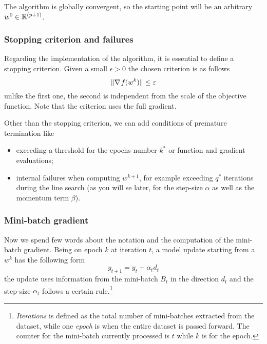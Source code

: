 The algorithm is globally convergent, so the starting point will be an arbitrary $w^0\in\mathbb{R}^{(p+1)}$.

\subsubsection*{Stopping criterion and failures}

Regarding the implementation of the algorithm, it is essential to define a stopping criterion. Given a small $\epsilon>0$ the chosen criterion is as follows
\begin{equation}\label{eq:stopping}
\lVert\nabla\operatorname*{\mathit{f}}(w^k)\rVert\leq\varepsilon
\end{equation}
unlike the first one, the second is independent from the scale of the objective function. Note that the criterion uses the full gradient.

Other than the stopping criterion, we can add conditions of premature termination like
\begin{itemize}
\item exceeding a threshold for the epochs number $k^\ast$ or function and gradient evaluations;
\item internal failures when computing $w^{k+1}$, for example exceeding $q^\ast$ iterations during the line search (as you will se later, for the step-size $\alpha$ as well as the momentum term $\beta$).
\end{itemize}


\subsubsection*{Mini-batch gradient}

Now we spend few words about the notation and the computation of the mini-batch gradient. Being on epoch $k$ at iteration $t$, a model update starting from a $w^k$ has the following form
\begin{equation}\label{eq:sgd-step}
y_{t+1}=y_t+\alpha_td_t
\end{equation}
the update uses information from the mini-batch $B_t$ in the direction $d_t$ and the step-size $\alpha_t$ follows a certain rule.\footnote{\emph{Iterations} is defined as the total number of mini-batches extracted from the dataset, while one \emph{epoch} is when the entire dataset is passed forward. The counter for the mini-batch currently processed is $t$ while $k$ is for the epoch.}

